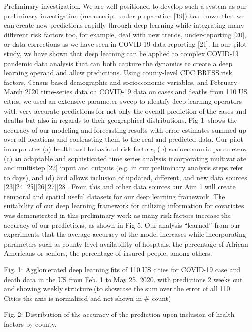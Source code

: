 Preliminary investigation. We are well-positioned to develop such a system as our preliminary investigation (manuscript under preparation [19]) has shown that we can create new predictions rapidly through deep learning while integrating many different risk factors too, for example, deal with new trends, under-reporting [20], or data corrections as we have seen in COVID-19 data reporting [21]. In our pilot study, we have shown that deep learning can be applied to complex COVID-19 pandemic data analysis that can both capture the dynamics to create a deep learning operand and allow predictions. Using county-level CDC BRFSS risk factors, Census-based demographic and socioeconomic variables, and February-March 2020 time-series data on COVID-19 data on cases and deaths from 110 US cities, we used an extensive parameter sweep to identify deep learning operators with very accurate predictions for not only the overall prediction of the cases and deaths but also in regards to their geographical distributions. Fig 1. shows the accuracy of our modeling and forecasting results with error estimates summed up over all locations and contrasting them to the real and predicted data. 
Our pilot incorporates (a) health and behavioral risk factors, (b) socioeconomic parameters, (c) an adaptable and sophisticated time series analysis incorporating multivariate and multistep [22] input and outputs (e.g. in our preliminary analysis steps refer to days), and  (d) and allows inclusion of updated, different, and new data sources [23][24][25][26][27][28]. From this and other data sources our Aim 1 will create temporal and spatial useful datasets for our deep learning framework. The suitability of our deep learning framework for utilizing information for covariates was demonstrated in this preliminary work as many risk factors increase the accuracy of our predictions, as shown in Fig 5. Our analysis “learned” from our experiments that the average accuracy of the model increases while incorporating parameters such as county-level availability of hospitals, the percentage of African Americans or seniors, the percentage of insured people, among others. 

 
Fig. 1: Agglomerated deep learning fits of 110 US cities for COVID-19 case and death data in the US from Feb. 1 to May 25, 2020, with predictions 2 weeks out and showing weekly structure (to showcase the sum over the error of all 110 Cities the  axis is normalized and not shown in \# count)
	
 
Fig. 2: Distribution of the accuracy of the prediction upon inclusion of health factors by county.


